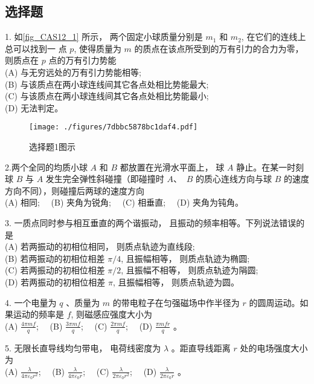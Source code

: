 \subsection{选择题}
1. 如\autoref{fig_CAS12_1} 所示， 两个固定小球质量分别是 $m_{1}$ 和 $m_{2}$, 在它们的连线上总可以找到一
点 $p$, 使得质量为 $m$ 的质点在该点所受到的万有引力的合力为零， 则质点在 $p$
点的万有引力势能\\
(A) 与无穷远处的万有引力势能相等;\\
(B) 与该质点在两小球连线间其它各点处相比势能最大;\\
(C) 与该质点在两小球连线间其它各点处相比势能最小;\\
(D) 无法判定。
\begin{figure}[ht]
\centering
\texttt{[image: ./figures/7dbbc5878bc1daf4.pdf]}
\caption{选择题1图示} \label{fig_CAS12_1}
\end{figure}
2.两个全同的均质小球 ${A}$ 和 ${B}$ 都放置在光滑水平面上， 球 ${A}$ 静止。在某一时刻球 ${B}$ 与 ${A}$ 发生完全弹性斜碰撞（即碰撞时 ${A}$、 ${~B}$ 的质心连线方向与球 ${B}$ 的速度方向不同），则碰撞后两球的速度方向\\
(A) 相同;$\quad$
(B) 夹角为锐角;$\quad$
(C) 相垂直;$\quad$
(D) 夹角为钝角。

3. 一质点同时参与相互垂直的两个谐振动， 且振动的频率相等。下列说法错误的是\\
(A) 若两振动的初相位相同， 则质点轨迹为直线段;\\
(B) 若两振动的初相位相差 $\pi / 4$, 且振幅相等， 则质点轨迹为椭圆;\\
(C) 若两振动的初相位相差 $\pi / 2$, 且振幅不相等， 则质点轨迹为䧎圆;\\
(D) 若两振动的初相位相差 $\pi$, 且振幅相等， 则质点轨迹为圆。

4. 一个电量为 $q$ 、质量为 $m$ 的带电粒子在匀强磁场中作半径为 $r$ 的圆周运动。如果运动的频率是 $f$, 则磁感应强度大小为\\
(A) $\frac{4 \pi m f}{q}$;$\quad$
(B) $\frac{3 \pi m f}{q}$;$\quad$
(C) $\frac{2 \pi m f}{q}$;$\quad$
(D) $\frac{\pi m f r}{q}$ 。

5. 无限长直导线均匀带电， 电荷线密度为 $\lambda$ 。距直导线距离 $r$ 处的电场强度大小为\\
(A) $\frac{\lambda}{4 \pi \varepsilon_{0} r^{2}}$;$\quad$
(B) $\frac{\lambda}{4 \pi \varepsilon_{0} r}$;$\quad$
(C) $\frac{\lambda}{2 \pi \varepsilon_{0} r^{2}}$;$\quad$
(D) $\frac{\lambda}{2 \pi \varepsilon_{0} r}$ 。

